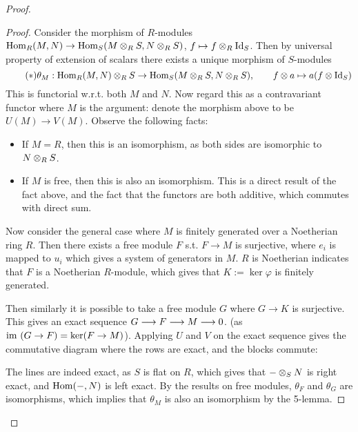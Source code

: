 \begin{proof}
\begin{enumerate}
        \begin{proof}
            Consider the morphism of $R$-modules $\mathrm{Hom}_R(M, N) \to \mathrm{Hom}_S(M \otimes_R S, N \otimes_R S)$, $f \mapsto f \otimes_R \mathrm{Id}_S$. Then by universal property of extension of scalars there exists a unique morphism of $S$-modules
            \begin{equation}\tag{$\ast$}
                \theta_M: \mathrm{Hom}_R(M, N) \otimes_R S \to \mathrm{Hom}_S(M \otimes_R S, N \otimes_R S), \qquad f \otimes a \mapsto a (f \otimes \mathrm{Id}_S)
            \end{equation}
            This is functorial w.r.t. both $M$ and $N$. Now regard this as a contravariant functor where $M$ is the argument: denote the morphism above to be $U(M) \to V(M)$. Observe the following facts:
            \begin{itemize}
                \item If $M = R$, then this is an isomorphism, as both sides are isomorphic to $N \otimes_R S$. 
                \item If $M$ is free, then this is also an isomorphism. This is a direct result of the fact above, and the fact that the functors are both additive, which commutes with direct sum.
            \end{itemize}
            Now consider the general case where $M$ is finitely generated over a Noetherian ring $R$. Then there exists a free module $F$ s.t. $F \to M$ is surjective, where $e_i$ is mapped to $u_i$ which gives a system of generators in $M$. $R$ is Noetherian indicates that $F$ is a Noetherian $R$-module, which gives that $K := \ker \varphi$ is finitely generated.

            Then similarly it is possible to take a free module $G$ where $G \to K$ is surjective. This gives an exact sequence $G \longrightarrow F \longrightarrow M \longrightarrow 0$. (as $\mathrm{im}\  (G \to F) = \ker (F \to M)$). Applying $U$ and $V$ on the exact sequence gives the commutative diagram where the rows are exact, and the blocks commute:
            \begin{figure}[htbp]
                \centering
            \end{figure}
            The lines are indeed exact, as $S$ is flat on $R$, which gives that $- \otimes_S N$ is right exact, and $\mathrm{Hom}(-, N)$ is left exact. By the results on free modules, $\theta_F$ and $\theta_G$ are isomorphisms, which implies that $\theta_M$ is also an isomorphism by the 5-lemma. 
        \end{proof}


\end{enumerate}
\end{proof}
